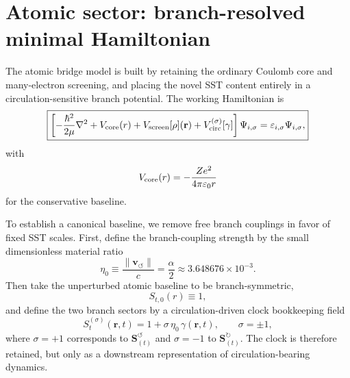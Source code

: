 \documentclass[11pt,a4paper]{article}
\begin{document}
    \section{Atomic sector: branch-resolved minimal Hamiltonian}
    \label{sec:atomic-H}
    The atomic bridge model is built by retaining the ordinary Coulomb core and many-electron screening, and placing the novel SST content entirely in a circulation-sensitive branch potential. The working Hamiltonian is
    \begin{equation}
        \label{eq:master-H}
        \boxed{
            \left[
                -\frac{\hbar^2}{2\mu}\nabla^2
            +V_{\rm core}(r)
            +V_{\rm screen}[\rho](\mathbf r)
            +V_{\rm circ}^{(\sigma)}[\gamma]
            \right]\Psi_{i,\sigma}
            =\varepsilon_{i,\sigma}\Psi_{i,\sigma},
        }
    \end{equation}
    with
    \begin{equation}
        \label{eq:Vcore}
        V_{\rm core}(r)=-\frac{Ze^2}{4\pi\varepsilon_0 r}
    \end{equation}
    for the conservative baseline.
    
    To establish a canonical baseline, we remove free branch couplings in favor of fixed SST scales. First, define the branch-coupling strength by the small dimensionless material ratio
    \begin{equation}
        \label{eq:eta0}
        \boxed{
            \eta_0 \equiv \frac{\lVert\mathbf{v}_{\!\boldsymbol{\circlearrowleft}}\rVert}{c} = \frac{\alpha}{2} \approx 3.648676\times 10^{-3}.
        }
    \end{equation}
    Then take the unperturbed atomic baseline to be branch-symmetric,
    \begin{equation}
        \label{eq:St0freeze}
        S_{t,0}(r)\equiv 1,
    \end{equation}
    and define the two branch sectors by a circulation-driven clock bookkeeping field
    \begin{equation}
        \label{eq:StBranches}
        \boxed{
            S_t^{(\sigma)}(\mathbf r,t)=1+\sigma\,\eta_0\,\gamma(\mathbf r,t),
            \qquad
            \sigma=\pm 1,
        }
    \end{equation}
    where $\sigma=+1$ corresponds to $\mathbf{S}_{(t)}^{\!\boldsymbol{\circlearrowleft}}$ and $\sigma=-1$ to $\mathbf{S}_{(t)}^{\!\boldsymbol{\circlearrowright}}$. The clock is therefore retained, but only as a downstream representation of circulation-bearing dynamics.
    
\end{document}
